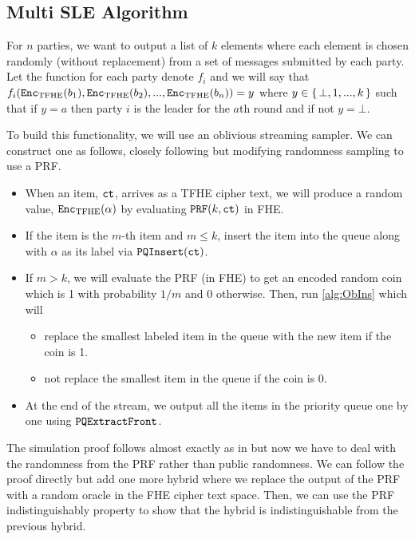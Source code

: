 \subsection{Multi SLE Algorithm}

For $n$ parties, we want to output a list of $k$ elements where each element is chosen randomly (without replacement) from a set of messages submitted by each party.
Let the function for each party denote $f_i$ and we will say that $f_i(\texttt{Enc}_{\mathrm{TFHE}}(b_1), \texttt{Enc}_{\mathrm{TFHE}}(b_2), ..., \texttt{Enc}_{\mathrm{TFHE}}(b_n)) = y$ where $y \in \set{\bot, 1, ..., k}$
such that if $y=a$ then party $i$ is the leader for the $a$th round and if not $y = \bot$.

To build this functionality, we will use an oblivious streaming sampler. We can construct one as follows, closely following \cite{shi2020path} but modifying randomness sampling to use a PRF.
\begin{itemize}
	\item When an item, $\texttt{ct}$, arrives as a TFHE cipher text, we will produce a random value, $\texttt{Enc}_{\mathrm{TFHE}}(\alpha)$ by evaluating $\texttt{PRF}(k, \texttt{ct})$ in FHE.
	\item If the item is the $m$-th item and $m \leq k$, insert the item into the queue along with $\alpha$ as its label via $\texttt{PQInsert}(\texttt{ct})$.
	\item If $m > k$, we will evaluate the PRF (in FHE) to get an encoded random coin which is 1 with probability $1/m$ and 0 otherwise.
	Then, run \cref{alg:ObIns} which will
	\begin{itemize}
		\item replace the smallest labeled item in the queue with the new item if the coin is 1.
		\item not replace the smallest item in the queue if the coin is 0.
	\end{itemize}
	\item At the end of the stream, we output all the items in the priority queue one by one using $\texttt{PQExtractFront}$.
\end{itemize}
The simulation proof follows almost exactly as in \cite{shi2020path} but now we have to deal with the randomness from 
the PRF rather than public randomness. We can follow the proof directly but add one more hybrid where we replace the output of the PRF with a random oracle in the FHE cipher text space.
Then, we can use the PRF indistinguishably property to show that the hybrid is indistinguishable from the previous hybrid.\\

